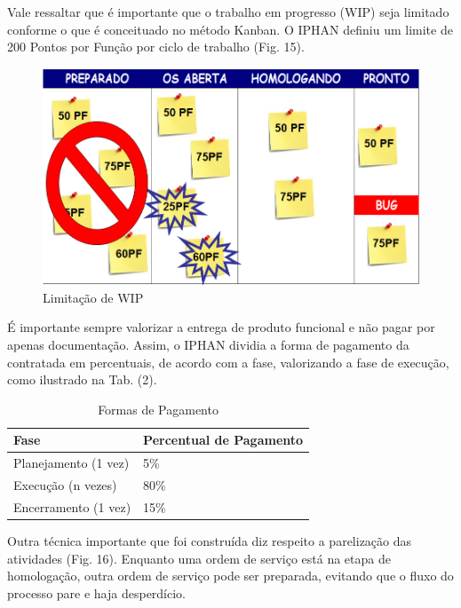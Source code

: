 Vale ressaltar que é importante que o trabalho em progresso (WIP) seja limitado conforme o que é conceituado no método Kanban. O IPHAN definiu um limite de 200 Pontos por Função por ciclo de trabalho (Fig. 15). 

\begin{figure}[h]
		\centering
		\label{fig08}
			\includegraphics[scale=0.5]{figuras/kanbanIPHAN4.png}
		\caption{Limitação de WIP \cite{parente}}
\end{figure}

É importante sempre valorizar a entrega de produto funcional e não pagar por apenas documentação. Assim, o IPHAN dividia a forma de pagamento da contratada em percentuais, de acordo com a fase, valorizando a fase de execução, como ilustrado na Tab. (2).


\begin{table}[H]
\center
\footnotesize
\begin{tabular}{|p{6cm}|p{6cm}|}
  \hline
   \textbf{Fase} & \textbf{Percentual de Pagamento}\\
    \hline
   Planejamento (1 vez) & 5\%\\
   \hline    
   Execução (n vezes) & 80\%\\
    \hline
   Encerramento (1 vez) & 15\%\\
   \hline
\end{tabular}
\caption{Formas de Pagamento}
\end{table}


Outra técnica importante que foi construída diz respeito a parelização das atividades (Fig. 16). Enquanto uma ordem de serviço está na etapa de homologação, outra ordem de serviço pode ser preparada, evitando que o fluxo do processo pare e haja desperdício. 

